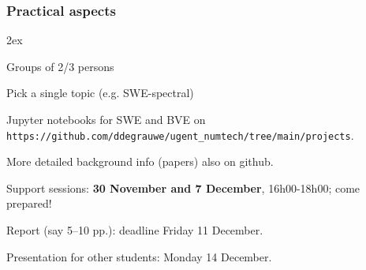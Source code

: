 \documentclass[aspectratio=149,9pt]{beamer}
\begin{document}
%
%
\begin{frame}
	\frametitle{Practical aspects}
	\begin{myitemize}{2ex}
		\item Groups of 2/3 persons
		\item Pick a single topic (e.g. SWE-spectral)
		\item Jupyter notebooks for SWE and BVE on\\ \texttt{https://github.com/ddegrauwe/ugent\_numtech/tree/main/projects}.
		\item More detailed background info (papers) also on github.
		\item Support sessions: \textbf{30 November and 7 December}, 16h00-18h00; come prepared!
		\item Report (say 5--10 pp.): deadline Friday 11 December.
		\item Presentation for other students: Monday 14 December.
	\end{myitemize}
\end{frame}
%
%
\end{document}
